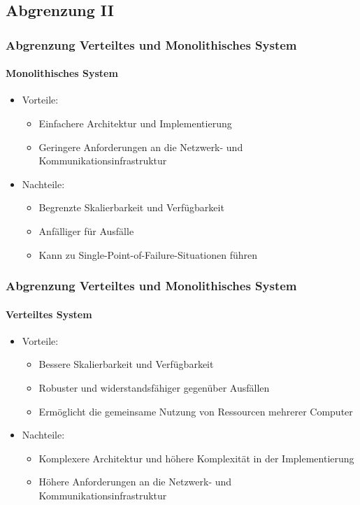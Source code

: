 \subsection{Abgrenzung II}
\begin{frame}
  \frametitle{Abgrenzung Verteiltes und Monolithisches System}
  \framesubtitle{Monolithisches System}
  \begin{itemize}
  \item Vorteile:
    \begin{itemize}
    \item Einfachere Architektur und Implementierung
    \item Geringere Anforderungen an die Netzwerk- und Kommunikationsinfrastruktur
    \end{itemize}
  \item Nachteile:
    \begin{itemize}
    \item Begrenzte Skalierbarkeit und Verfügbarkeit
    \item Anfälliger für Ausfälle
    \item Kann zu Single-Point-of-Failure-Situationen führen
    \end{itemize}
  \end{itemize}
\end{frame}

\begin{frame}
  \frametitle{Abgrenzung Verteiltes und Monolithisches System}
  \framesubtitle{Verteiltes System}

  \begin{itemize}
  \item Vorteile:
    \begin{itemize}
    \item Bessere Skalierbarkeit und Verfügbarkeit
    \item Robuster und widerstandsfähiger gegenüber Ausfällen
    \item Ermöglicht die gemeinsame Nutzung von Ressourcen mehrerer Computer
    \end{itemize}
  \item Nachteile:
    \begin{itemize}
    \item Komplexere Architektur und höhere Komplexität in der Implementierung
    \item Höhere Anforderungen an die Netzwerk- und Kommunikationsinfrastruktur
    \end{itemize}
  \end{itemize}
\end{frame}


